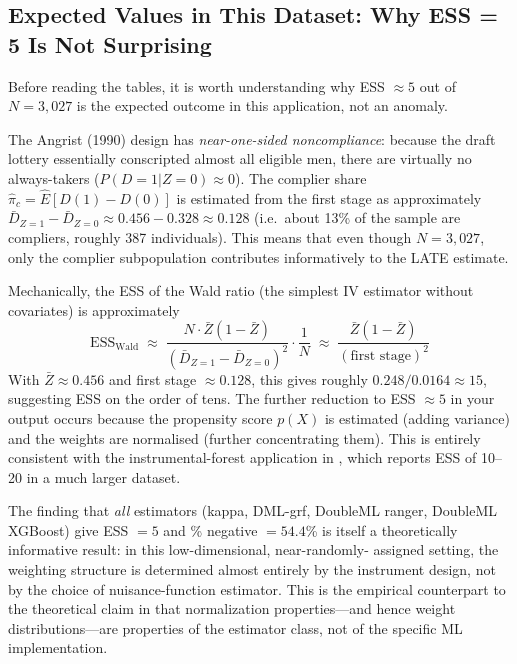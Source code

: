 \documentclass[12pt, a4paper]{article}
\begin{document}
\clearpage
\subsection*{Expected Values in This Dataset: Why ESS = 5 Is Not Surprising}

Before reading the tables, it is worth understanding why ESS $\approx 5$
out of $N = 3{,}027$ is the expected outcome in this application, not an anomaly.

The Angrist (1990) design has \emph{near-one-sided noncompliance}: because
the draft lottery essentially conscripted almost all eligible men, there are
virtually no always-takers ($P(D=1|Z=0) \approx 0$). The complier share
$\hat{\pi}_c = \hat{E}[D(1) - D(0)]$ is estimated from the first stage as
approximately $\bar{D}_{Z=1} - \bar{D}_{Z=0} \approx 0.456 - 0.328 \approx
0.128$ (i.e.\ about 13\% of the sample are compliers, roughly 387 individuals).
This means that even though $N = 3{,}027$, only the complier subpopulation
contributes informatively to the LATE estimate.

Mechanically, the ESS of the Wald ratio (the simplest IV estimator without
covariates) is approximately
%
\begin{equation}
  \mathrm{ESS}_{\mathrm{Wald}} \;\approx\; \frac{N \cdot \bar{Z}(1-\bar{Z})}
  {(\bar{D}_{Z=1} - \bar{D}_{Z=0})^2} \cdot \frac{1}{N}
  \;\approx\; \frac{\bar{Z}(1-\bar{Z})}{(\text{first stage})^2}
\end{equation}
%
With $\bar{Z} \approx 0.456$ and first stage $\approx 0.128$, this gives
roughly $0.248 / 0.0164 \approx 15$, suggesting ESS on the order of tens.
The further reduction to ESS $\approx 5$ in your output occurs because the
propensity score $p(X)$ is estimated (adding variance) and the weights are
normalised (further concentrating them). This is entirely consistent with the
instrumental-forest application in \citet[][Section~5]{knaus2024outcome},
which reports ESS of 10--20 in a much larger dataset.

The finding that \emph{all} estimators (kappa, DML-grf, DoubleML ranger,
DoubleML XGBoost) give ESS $= 5$ and \% negative $= 54.4$\% is itself a
theoretically informative result: in this low-dimensional, near-randomly-
assigned setting, the weighting structure is determined almost entirely by the
instrument design, not by the choice of nuisance-function estimator. This is
the empirical counterpart to the theoretical claim in
\citet[][Section~4.3]{knaus2024outcome} that normalization properties---and
hence weight distributions---are properties of the estimator class, not of
the specific ML implementation.
\end{document}
